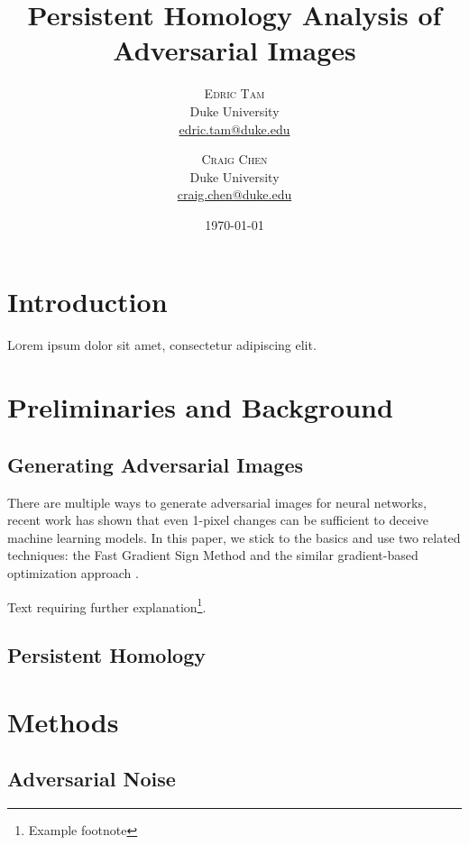\documentclass[twoside,twocolumn]{article}
\title{\LARGE Persistent Homology Analysis of Adversarial Images} %
\author{%
\textsc{Edric Tam}\\[1ex] %
\normalsize Duke University \\ %
\normalsize \href{mailto:edric.tam@duke.edu}{edric.tam@duke.edu} %
\and %
\textsc{Craig Chen}\\[1ex] %
\normalsize Duke University \\ %
\normalsize \href{mailto:craig.chen@duke.edu}{craig.chen@duke.edu} %
}
\date{\today} %
\begin{document}
\maketitle


\section{Introduction}

\lettrine[nindent=0em,lines=3]{L} orem ipsum dolor sit amet, consectetur adipiscing elit.
\blindtext %

\blindtext %


\section{Preliminaries and Background}

\subsection{Generating Adversarial Images}

There are multiple ways to generate adversarial images for neural networks, recent work has shown that even 1-pixel changes can be sufficient to deceive machine learning models. In this paper, we stick to the basics and use two related techniques: the Fast Gradient Sign Method \cite{goodfellow2014} and the similar gradient-based optimization approach \cite{szegedy2013}.

Text requiring further explanation\footnote{Example footnote}.

\subsection{Persistent Homology}


\section{Methods}

\subsection{Adversarial Noise}
\blindtext %
\end{document}
